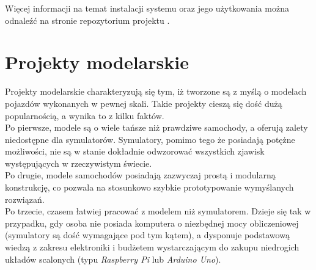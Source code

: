 Więcej informacji na temat instalacji systemu oraz jego użytkowania można odnaleźć na stronie repozytorium projektu \cite{deepdrive:github}.

\section{Projekty modelarskie}
Projekty modelarskie charakteryzują się tym, iż tworzone są z myślą o modelach pojazdów wykonanych w pewnej skali. Takie projekty cieszą się dość dużą popularnością, a wynika to z kilku faktów. \\
Po pierwsze, modele są o wiele tańsze niż prawdziwe samochody, a oferują zalety niedostępne dla symulatorów. Symulatory, pomimo tego że posiadają potężne możliwości, nie są w stanie dokładnie odwzorować wszystkich zjawisk występujących w rzeczywistym świecie. \\
Po drugie, modele samochodów posiadają zazwyczaj prostą i modularną konstrukcję, co pozwala na stosunkowo szybkie prototypowanie wymyślanych rozwiązań. \\
Po trzecie, czasem łatwiej pracować z modelem niż symulatorem. Dzieje się tak w przypadku, gdy osoba nie posiada komputera o niezbędnej mocy obliczeniowej (symulatory są dość wymagające pod tym kątem), a dysponuje podstawową wiedzą z zakresu elektroniki i budżetem wystarczającym do zakupu niedrogich układów scalonych (typu \textit{Raspberry Pi} lub \textit{Arduino Uno}).

